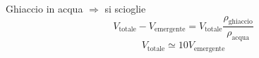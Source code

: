 \begin{Es}[Iceberg]
Ghiaccio in acqua $\Longrightarrow$ si scioglie
\begin{equation*}V_\text{totale}-V_\text{emergente}=V_\text{totale}\frac{\rho_\text{ghiaccio}}{\rho_\text{acqua}}\end{equation*}
\begin{equation*}V_\text{totale}\simeq 10 V_\text{emergente}\end{equation*}
\end{Es}
